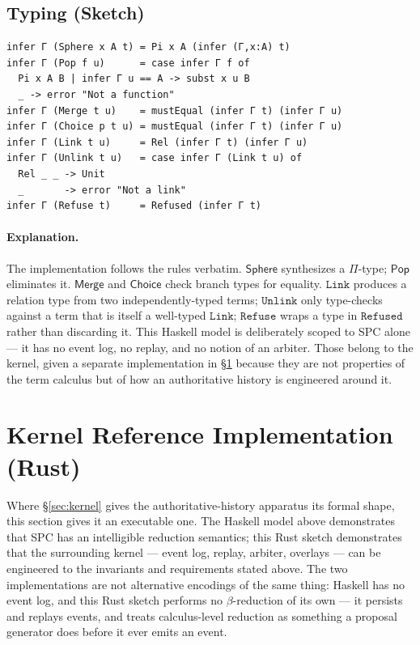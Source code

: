 \documentclass[12pt]{article}
\newcommand{\Sphere}{\mathsf{Sphere}}
\newcommand{\Pop}{\mathsf{Pop}}
\newcommand{\Merge}{\mathsf{Merge}}
\newcommand{\Choice}{\mathsf{Choice}}
\theoremstyle{definition}
\begin{document}
\subsection{Typing (Sketch)}
\begin{verbatim}
infer Γ (Sphere x A t) = Pi x A (infer (Γ,x:A) t)
infer Γ (Pop f u)      = case infer Γ f of
  Pi x A B | infer Γ u == A -> subst x u B
  _ -> error "Not a function"
infer Γ (Merge t u)    = mustEqual (infer Γ t) (infer Γ u)
infer Γ (Choice p t u) = mustEqual (infer Γ t) (infer Γ u)
infer Γ (Link t u)     = Rel (infer Γ t) (infer Γ u)
infer Γ (Unlink t u)   = case infer Γ (Link t u) of
  Rel _ _ -> Unit
  _       -> error "Not a link"
infer Γ (Refuse t)     = Refused (infer Γ t)
\end{verbatim}

\paragraph{Explanation.}
The implementation follows the rules verbatim. 
$\Sphere$ synthesizes a $\Pi$-type; $\Pop$ eliminates it. 
$\Merge$ and $\Choice$ check branch types for equality. $\mathtt{Link}$ produces a relation type from two independently-typed terms; $\mathtt{Unlink}$ only type-checks against a term that is itself a well-typed $\mathtt{Link}$; $\mathtt{Refuse}$ wraps a type in $\mathtt{Refused}$ rather than discarding it. This Haskell model is deliberately scoped to SPC alone — it has no event log, no replay, and no notion of an arbiter. Those belong to the kernel, given a separate implementation in \S\ref{sec:rust-kernel} because they are not properties of the term calculus but of how an authoritative history is engineered around it.

\section{Kernel Reference Implementation (Rust)}
\label{sec:rust-kernel}

Where \S\ref{sec:kernel} gives the authoritative-history apparatus its formal shape, this section gives it an executable one. The Haskell model above demonstrates that SPC has an intelligible reduction semantics; this Rust sketch demonstrates that the surrounding kernel — event log, replay, arbiter, overlays — can be engineered to the invariants and requirements stated above. The two implementations are not alternative encodings of the same thing: Haskell has no event log, and this Rust sketch performs no $\beta$-reduction of its own — it persists and replays events, and treats calculus-level reduction as something a proposal generator does before it ever emits an event.
\end{document}
